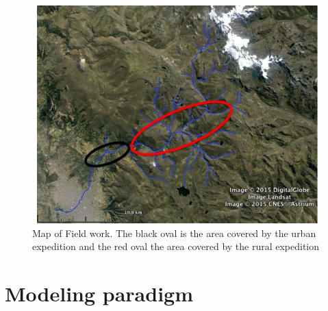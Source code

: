 \documentclass{article}
\begin{document}
\begin{figure}[h]
  \centering
  \includegraphics[width=0.6\linewidth]{etno}
  \caption[Map of Field work]{Map of Field work. The black oval is the area covered by the urban expedition and the red oval the area covered by the rural expedition}
  \label{etno}
\end{figure}

\section{Modeling paradigm}
\end{document}
